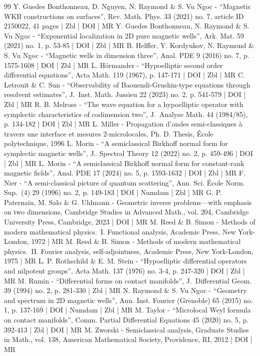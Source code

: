 \begin{thebibliography}{99}
Y. Guedes Bonthonneau, D. Nguyen, N. Raymond \& S. Vu Ngoc - “Magnetic WKB constructions on surfaces”, Rev. Math. Phys. 33 (2021) no. 7, article ID 2150022, 41 pages | Zbl | DOI | MR
Y. Guedes Bonthonneau, N. Raymond \& S. Vu Ngoc - “Exponential localization in 2D pure magnetic wells”, Ark. Mat. 59 (2021) no. 1, p. 53-85 | DOI | Zbl | MR
B. Helffer, Y. Kordyukov, N. Raymond \& S. Vu Ngoc - “Magnetic wells in dimension three”, Anal. PDE 9 (2016) no. 7, p. 1575-1608 | DOI | Zbl | MR
L. Hörmander - “Hypoelliptic second order differential equations”, Acta Math. 119 (1967), p. 147-171 | DOI | Zbl | MR
C. Letrouit \& C. Sun - “Observability of Baouendi-Grushin-type equations through resolvent estimates”, J. Inst. Math. Jussieu 22 (2023) no. 2, p. 541-579 | DOI | Zbl | MR
R. B. Melrose - “The wave equation for a hypoelliptic operator with symplectic characteristics of codimension two”, J. Analyse Math. 44 (1984/85), p. 134-182 | DOI | Zbl | MR
L. Miller - Propagation d’ondes semi-classiques à travers une interface et mesures $2$-microlocales, Ph. D. Thesis, École polytechnique, 1996
L. Morin - “A semiclassical Birkhoff normal form for symplectic magnetic wells”, J. Spectral Theory 12 (2022) no. 2, p. 459-496 | DOI | Zbl | MR
L. Morin - “A semiclassical Birkhoff normal form for constant-rank magnetic fields”, Anal. PDE 17 (2024) no. 5, p. 1593-1632 | DOI | Zbl | MR
F. Nier - “A semi-classical picture of quantum scattering”, Ann. Sci. École Norm. Sup. (4) 29 (1996) no. 2, p. 149-183 | DOI | Numdam | Zbl | MR
G. P. Paternain, M. Salo \& G. Uhlmann - Geometric inverse problems—with emphasis on two dimensions, Cambridge Studies in Advanced Math., vol. 204, Cambridge University Press, Cambridge, 2023 | DOI | MR
M. Reed \& B. Simon - Methods of modern mathematical physics. I. Functional analysis, Academic Press, New York-London, 1972 | MR
M. Reed \& B. Simon - Methods of modern mathematical physics. II. Fourier analysis, self-adjointness, Academic Press, New York-London, 1975 | MR
L. P. Rothschild \& E. M. Stein - “Hypoelliptic differential operators and nilpotent groups”, Acta Math. 137 (1976) no. 3-4, p. 247-320 | DOI | Zbl | MR
M. Rumin - “Differential forms on contact manifolds”, J. Differential Geom. 39 (1994) no. 2, p. 281-330 | Zbl | MR
N. Raymond \& S. Vu Ngoc - “Geometry and spectrum in 2D magnetic wells”, Ann. Inst. Fourier (Grenoble) 65 (2015) no. 1, p. 137-169 | DOI | Numdam | Zbl | MR
M. Taylor - “Microlocal Weyl formula on contact manifolds”, Comm. Partial Differential Equations 45 (2020) no. 5, p. 392-413 | Zbl | DOI | MR
M. Zworski - Semiclassical analysis, Graduate Studies in Math., vol. 138, American Mathematical Society, Providence, RI, 2012 | DOI | MR
\end{thebibliography}
